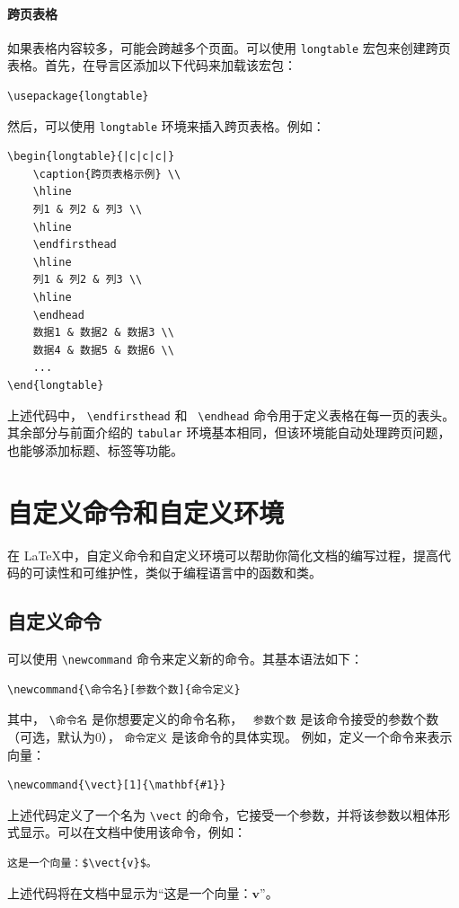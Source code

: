 \paragraph{跨页表格} 如果表格内容较多，可能会跨越多个页面。可以使用 \texttt{longtable} 宏包来创建跨页表格。首先，在导言区添加以下代码来加载该宏包：
\begin{verbatim}
\usepackage{longtable}
\end{verbatim}

然后，可以使用 \texttt{longtable} 环境来插入跨页表格。例如：
\begin{verbatim}
\begin{longtable}{|c|c|c|}
    \caption{跨页表格示例} \\
    \hline
    列1 & 列2 & 列3 \\
    \hline
    \endfirsthead
    \hline
    列1 & 列2 & 列3 \\
    \hline
    \endhead
    数据1 & 数据2 & 数据3 \\
    数据4 & 数据5 & 数据6 \\
    ... 
\end{longtable}
\end{verbatim}
上述代码中， \verb|\endfirsthead| 和 \verb| \endhead| 命令用于定义表格在每一页的表头。其余部分与前面介绍的 \texttt{tabular} 环境基本相同，但该环境能自动处理跨页问题，也能够添加标题、标签等功能。

\section{自定义命令和自定义环境}

在 \LaTeX 中，自定义命令和自定义环境可以帮助你简化文档的编写过程，提高代码的可读性和可维护性，类似于编程语言中的函数和类。

\subsection{自定义命令}
可以使用 \verb|\newcommand| 命令来定义新的命令。其基本语法如下：
\begin{verbatim}
\newcommand{\命令名}[参数个数]{命令定义}
\end{verbatim}
其中， \verb|\命令名| 是你想要定义的命令名称， \verb| 参数个数| 是该命令接受的参数个数（可选，默认为0）， \verb|命令定义| 是该命令的具体实现。 例如，定义一个命令来表示向量：
\begin{verbatim}
\newcommand{\vect}[1]{\mathbf{#1}}
\end{verbatim}
上述代码定义了一个名为 \verb|\vect| 的命令，它接受一个参数，并将该参数以粗体形式显示。可以在文档中使用该命令，例如：
\begin{verbatim}
这是一个向量：$\vect{v}$。
\end{verbatim}
上述代码将在文档中显示为“这是一个向量：\(\mathbf{v}\)”。

